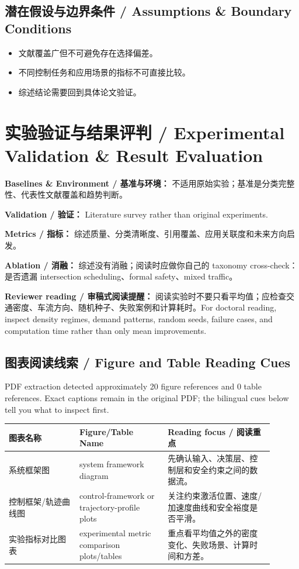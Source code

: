 \documentclass[UTF8,a4paper,11pt,fontset=fandol]{ctexart}
\begin{document}
\subsection{潜在假设与边界条件 / Assumptions \& Boundary Conditions}
\begin{itemize}
\item 文献覆盖广但不可避免存在选择偏差。
\item 不同控制任务和应用场景的指标不可直接比较。
\item 综述结论需要回到具体论文验证。
\end{itemize}


\section{实验验证与结果评判 / Experimental Validation \& Result Evaluation}
\textbf{Baselines \& Environment / 基准与环境：} 不适用原始实验；基准是分类完整性、代表性文献覆盖和趋势判断。

\textbf{Validation / 验证：} Literature survey rather than original experiments.

\textbf{Metrics / 指标：} 综述质量、分类清晰度、引用覆盖、应用关联度和未来方向启发。

\textbf{Ablation / 消融：} 综述没有消融；阅读时应做你自己的 taxonomy cross-check：是否遗漏 intersection scheduling、formal safety、mixed traffic。

\textbf{Reviewer reading / 审稿式阅读提醒：} 阅读实验时不要只看平均值；应检查交通密度、车流方向、随机种子、失败案例和计算耗时。For doctoral reading, inspect density regimes, demand patterns, random seeds, failure cases, and computation time rather than only mean improvements.

\subsection{图表阅读线索 / Figure and Table Reading Cues}
PDF extraction detected approximately 20 figure references and 0 table references. Exact captions remain in the original PDF; the bilingual cues below tell you what to inspect first.

\begin{longtable}{p{0.24\linewidth}p{0.30\linewidth}p{0.36\linewidth}}
\toprule
图表名称 & Figure/Table Name & Reading focus / 阅读重点\\
\midrule
系统框架图 & system framework diagram & 先确认输入、决策层、控制层和安全约束之间的数据流。 \\
控制框架/轨迹曲线图 & control-framework or trajectory-profile plots & 关注约束激活位置、速度/加速度曲线和安全裕度是否平滑。 \\
实验指标对比图表 & experimental metric comparison plots/tables & 重点看平均值之外的密度变化、失败场景、计算时间和方差。 \\
\bottomrule
\end{longtable}
\end{document}
